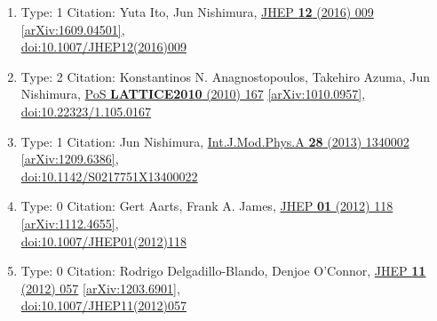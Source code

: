 \documentclass[a4paper,10pt]{article}
\begin{document}
\begin{enumerate}
\begin{enumerate}
  \item Type: 1 Citation: Yuta Ito, Jun Nishimura, \href{https://www.doi.org/10.1007/JHEP12(2016)009}{JHEP {\bf 12} (2016) 009}  \href{https://arxiv.org/abs/1609.04501}{[arXiv:1609.04501]},\\\href{https://www.doi.org/10.1007/JHEP12(2016)009}{doi:10.1007/JHEP12(2016)009}
  \item Type: 2 Citation: Konstantinos N. Anagnostopoulos, Takehiro Azuma, Jun Nishimura, \href{https://www.doi.org/10.22323/1.105.0167}{PoS {\bf LATTICE2010} (2010) 167}  \href{https://arxiv.org/abs/1010.0957}{[arXiv:1010.0957]},\\\href{https://www.doi.org/10.22323/1.105.0167}{doi:10.22323/1.105.0167}
  \item Type: 1 Citation: Jun Nishimura, \href{https://www.doi.org/10.1142/S0217751X13400022}{Int.J.Mod.Phys.A {\bf 28} (2013) 1340002}  \href{https://arxiv.org/abs/1209.6386}{[arXiv:1209.6386]},\\\href{https://www.doi.org/10.1142/S0217751X13400022}{doi:10.1142/S0217751X13400022}
  \item Type: 0 Citation: Gert Aarts, Frank A. James, \href{https://www.doi.org/10.1007/JHEP01(2012)118}{JHEP {\bf 01} (2012) 118}  \href{https://arxiv.org/abs/1112.4655}{[arXiv:1112.4655]},\\\href{https://www.doi.org/10.1007/JHEP01(2012)118}{doi:10.1007/JHEP01(2012)118}
  \item Type: 0 Citation: Rodrigo Delgadillo-Blando, Denjoe O'Connor, \href{https://www.doi.org/10.1007/JHEP11(2012)057}{JHEP {\bf 11} (2012) 057}  \href{https://arxiv.org/abs/1203.6901}{[arXiv:1203.6901]},\\\href{https://www.doi.org/10.1007/JHEP11(2012)057}{doi:10.1007/JHEP11(2012)057}

\end{enumerate}
\end{enumerate}
\end{document}
